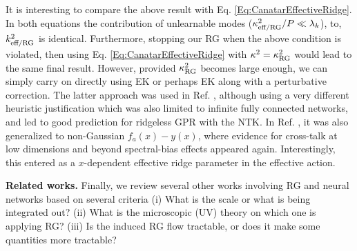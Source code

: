 It is interesting to compare the above result with Eq. \ref{Eq:CanatarEffectiveRidge}. In both equations the contribution of unlearnable modes ($\kappa^2_{\text{eff}/\text{RG}}/P \ll \lambda_k$), to, $k_{\text{eff}/\text{RG}}^2$ is identical. Furthermore, stopping our RG when the above condition is violated, then using Eq. \ref{Eq:CanatarEffectiveRidge} with $\kappa^2=\kappa_{\text{RG}}^2$ would lead to the same final result. However, provided $\kappa^2_{\text{RG}}$ becomes large enough, we can simply carry on directly using EK or perhaps EK along with a perturbative correction. The latter approach was used in Ref. \cite{cohen2021learning}, although using a very different heuristic justification which was also limited to infinite fully connected networks, and led to good prediction for ridgeless GPR with the NTK. In Ref. \cite{howard2024}, it was also generalized to non-Gaussian $f_a(x)-y(x)$, where evidence for cross-talk at low dimensions and beyond spectral-bias effects appeared again. Interestingly, this entered as a $x$-dependent effective ridge parameter in the effective action.   

{\bf Related works.} Finally, we review several other works involving RG and neural networks based on several criteria (i) What is the scale or what is being integrated out? (ii) What is the microscopic (UV) theory on which one is applying RG? (iii) Is the induced RG flow tractable, or does it make some quantities more tractable? 

